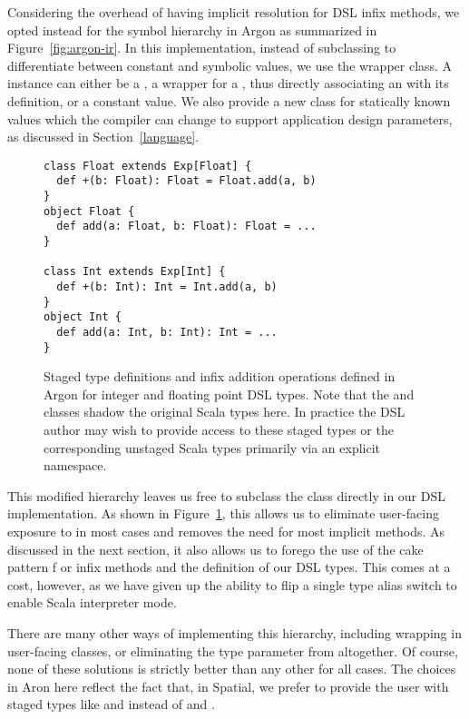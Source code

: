 Considering the overhead of having implicit resolution for DSL infix methods,
we opted instead for the symbol hierarchy in Argon as summarized
in Figure~\ref{fig:argon-ir}. In this implementation, instead of subclassing
 to differentiate between constant and symbolic values, we
use the  wrapper class. A  instance can either
be a , a wrapper for a , thus directly associating
an  with its definition, or a constant  value.
We also provide a new  class for statically known values which
the compiler can change to support application design parameters, as discussed in Section~\ref{language}.

\begin{figure}
\begin{lstlisting}[language=ScalaDSL]
class Float extends Exp[Float] {
  def +(b: Float): Float = Float.add(a, b)
}
object Float {
  def add(a: Float, b: Float): Float = ...
}

class Int extends Exp[Int] {
  def +(b: Int): Int = Int.add(a, b)
}
object Int {
  def add(a: Int, b: Int): Int = ...
}
\end{lstlisting}
\caption{Staged type definitions and infix addition operations defined in Argon for integer and floating point DSL types.
Note that the  and  classes shadow the original Scala types here.
In practice the DSL author may wish to provide access to these staged types or the
corresponding unstaged Scala types primarily via an explicit namespace.}
\label{fig:argon-ir-example}
\end{figure}

This modified hierarchy leaves us free to subclass the  class
directly in our DSL implementation. As shown in Figure~\ref{fig:argon-ir-example}, this allows us to eliminate user-facing
exposure to  in most cases and removes the need for most
implicit methods. As discussed in the next section,
it also allows us to forego the use of the cake pattern f
or infix methods and the definition of our DSL types.
This comes at a cost, however, as we have given up the ability to
flip a single type alias switch to enable Scala interpreter mode.

There are many other ways of implementing this hierarchy, including
wrapping  in user-facing classes, or eliminating the
type parameter from  altogether. Of course, none of these solutions
is strictly better than any other for all cases. The choices in Aron here
reflect the fact that, in Spatial, we prefer to provide
the user with staged types like  and  instead of
 and .

